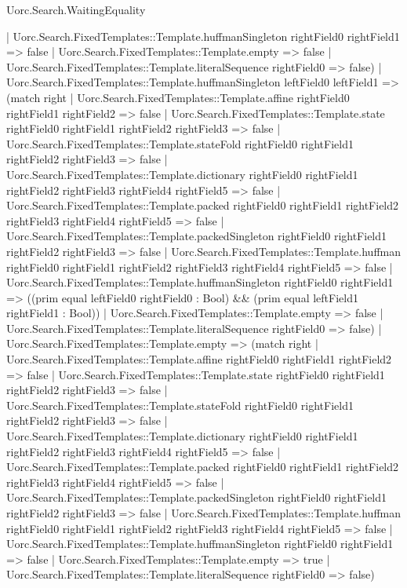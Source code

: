 \begin{lexlean}{Uorc.Search.WaitingEquality}
\begin{semanticmodule}
{      | Uorc.Search.FixedTemplates::Template.huffmanSingleton rightField0 rightField1 => false
      | Uorc.Search.FixedTemplates::Template.empty => false
      | Uorc.Search.FixedTemplates::Template.literalSequence rightField0 => false)
    | Uorc.Search.FixedTemplates::Template.huffmanSingleton leftField0 leftField1 => (match right
      | Uorc.Search.FixedTemplates::Template.affine rightField0 rightField1 rightField2 => false
      | Uorc.Search.FixedTemplates::Template.state rightField0 rightField1 rightField2 rightField3 => false
      | Uorc.Search.FixedTemplates::Template.stateFold rightField0 rightField1 rightField2 rightField3 => false
      | Uorc.Search.FixedTemplates::Template.dictionary rightField0 rightField1 rightField2 rightField3 rightField4 rightField5 => false
      | Uorc.Search.FixedTemplates::Template.packed rightField0 rightField1 rightField2 rightField3 rightField4 rightField5 => false
      | Uorc.Search.FixedTemplates::Template.packedSingleton rightField0 rightField1 rightField2 rightField3 => false
      | Uorc.Search.FixedTemplates::Template.huffman rightField0 rightField1 rightField2 rightField3 rightField4 rightField5 => false
      | Uorc.Search.FixedTemplates::Template.huffmanSingleton rightField0 rightField1 => ((prim equal leftField0 rightField0 : Bool) && (prim equal leftField1 rightField1 : Bool))
      | Uorc.Search.FixedTemplates::Template.empty => false
      | Uorc.Search.FixedTemplates::Template.literalSequence rightField0 => false)
    | Uorc.Search.FixedTemplates::Template.empty => (match right
      | Uorc.Search.FixedTemplates::Template.affine rightField0 rightField1 rightField2 => false
      | Uorc.Search.FixedTemplates::Template.state rightField0 rightField1 rightField2 rightField3 => false
      | Uorc.Search.FixedTemplates::Template.stateFold rightField0 rightField1 rightField2 rightField3 => false
      | Uorc.Search.FixedTemplates::Template.dictionary rightField0 rightField1 rightField2 rightField3 rightField4 rightField5 => false
      | Uorc.Search.FixedTemplates::Template.packed rightField0 rightField1 rightField2 rightField3 rightField4 rightField5 => false
      | Uorc.Search.FixedTemplates::Template.packedSingleton rightField0 rightField1 rightField2 rightField3 => false
      | Uorc.Search.FixedTemplates::Template.huffman rightField0 rightField1 rightField2 rightField3 rightField4 rightField5 => false
      | Uorc.Search.FixedTemplates::Template.huffmanSingleton rightField0 rightField1 => false
      | Uorc.Search.FixedTemplates::Template.empty => true
      | Uorc.Search.FixedTemplates::Template.literalSequence rightField0 => false)
}
\end{semanticmodule}
\end{lexlean}

